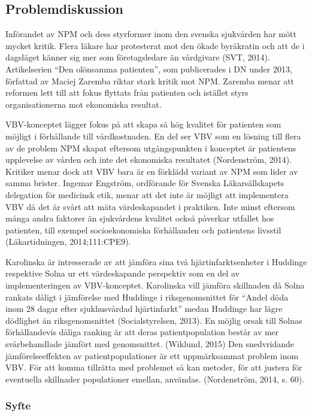 \subsection{Problemdiskussion}

Införandet av NPM och dess styrformer inom den svenska sjukvården har mött mycket kritik. Flera läkare har protesterat mot den ökade byråkratin och att de i dagsläget känner sig mer som företagsledare än vårdgivare (SVT, 2014). Artikelserien “Den olönsamma patienten”, som publicerades i DN under 2013, författad av Maciej Zaremba riktar stark kritik mot NPM. Zaremba menar att reformen lett till att fokus flyttats från patienten och istället styrs organisationerna mot ekonomiska resultat.
 
VBV-konceptet lägger fokus på att skapa så hög kvalitet för patienten som möjligt i förhållande till vårdkostnaden. En del ser VBV som en lösning till flera av de problem NPM skapat eftersom utgångspunkten i konceptet är patientens upplevelse av vården och inte det ekonomiska resultatet (Nordenström, 2014). Kritiker menar dock att VBV bara är en förklädd variant av NPM som lider av samma brister. Ingemar Engström, ordförande för Svenska Läkarsällskapets delegation för medicinsk etik, menar att det inte är möjligt att implementera VBV då det är svårt att mäta värdeskapandet i praktiken. Inte minst eftersom många andra faktorer än sjukvårdens kvalitet också påverkar utfallet hos patienten, till exempel socioekonomiska förhållanden och patientens livsstil (Läkartidningen, 2014;111:CPE9).
 
Karolinska är intresserade av att jämföra sina två hjärtinfarktsenheter i Huddinge respektive Solna ur ett värdeskapande perspektiv som en del av implementeringen av VBV-konceptet. Karolinska vill jämföra skillnaden då Solna rankats dåligt i jämförelse med Huddinge i riksgenomsnittet för “Andel döda inom 28 dagar efter sjukhusvårdad hjärtinfarkt” medan Huddinge har lägre dödlighet än riksgenomsnittet (Socialstyrelsen, 2013). En möjlig orsak till Solnas förhållandevis dåliga ranking är att deras patientpopulation består av mer svårbehandlade jämfört med genomsnittet. (Wiklund, 2015) Den snedvridande jämförelseeffekten av patientpopulationer är ett uppmärksammat problem inom VBV. För att komma tillrätta med problemet så kan metoder, för att justera för eventuella skillnader populationer emellan, användas. (Nordenström, 2014, s. 60).


\subsubsection{Syfte}

